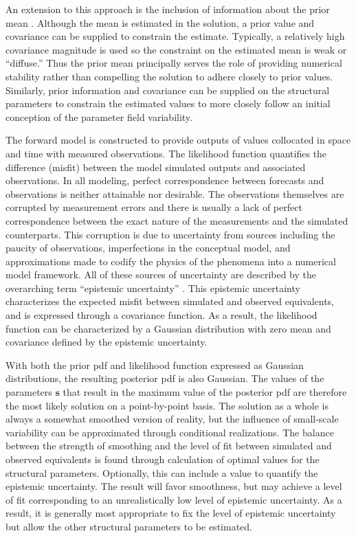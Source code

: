 \documentclass[11pt,oneside,onecolumn]{usgsreport}
\begin{document}
\begin{multicols}{2}
\begin{bibunit}
An extension to this approach is the inclusion of information about
the prior mean \citep{NowakCirpka2004}. Although the mean is estimated
in the solution, a prior value and covariance can be supplied to constrain
the estimate. Typically, a relatively high covariance magnitude is
used so the constraint on the estimated mean is weak or ``diffuse.''
Thus the prior mean principally serves the role of providing numerical
stability rather than compelling the solution to adhere closely to
prior values. Similarly, prior information and covariance can be supplied
on the structural parameters to constrain the estimated values to
more closely follow an initial conception of the parameter field variability.

The forward model is constructed to provide outputs of values collocated
in space and time with measured observations. The likelihood function
quantifies the difference (misfit) between the model simulated outputs
and associated observations. In all modeling, perfect correspondence
between forecasts and observations is neither attainable nor desirable.
The observations themselves are corrupted by measurement errors and
there is usually a lack of perfect correspondence between the exact
nature of the measurements and the simulated counterparts. This corruption
is due to uncertainty from sources including the paucity of observations,
imperfections in the conceptual model, and approximations made to
codify the physics of the phenomena into a numerical model framework.
All of these sources of uncertainty are described by the overarching
term ``epistemic uncertainty'' \citep[p. 4]{Rubin2003}. This epistemic
uncertainty characterizes the expected misfit between simulated and
observed equivalents, and is expressed through a covariance function.
As a result, the likelihood function can be characterized by a Gaussian
distribution with zero mean and covariance defined by the epistemic
uncertainty.

With both the prior pdf and likelihood function expressed as Gaussian
distributions, the resulting posterior pdf is also Gaussian. The values
of the parameters $\mathbf{s}$ that result in the maximum value of
the posterior pdf are therefore the most likely solution on a point-by-point
basis. The solution as a whole is always a somewhat smoothed version
of reality, but the influence of small-scale variability can be approximated
through conditional realizations. The balance between the strength
of smoothing and the level of fit between simulated and observed equivalents
is found through calculation of optimal values for the structural
parameters. Optionally, this can include a value to quantify the epistemic
uncertainty. The result will favor smoothness, but may achieve a level
of fit corresponding to an unrealistically low level of epistemic
uncertainty. As a result, it is generally most appropriate to fix
the level of epistemic uncertainty but allow the other structural
parameters to be estimated.


\end{bibunit}
\end{multicols}
\end{document}
